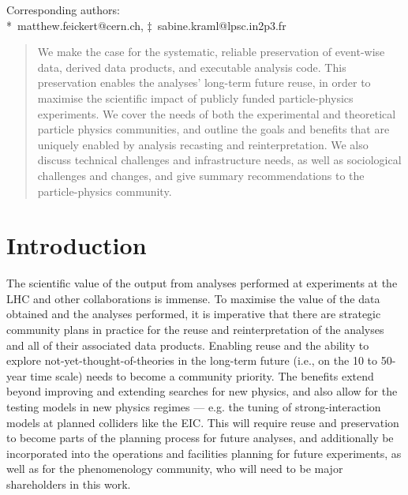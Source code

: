 \documentclass[11pt]{article}
\begin{document}
\begin{center}
Corresponding authors:\\
*~matthew.feickert@cern.ch, $\ddagger$~sabine.kraml@lpsc.in2p3.fr
\end{center}


\begin{abstract}
\noindent We make the case for the systematic, reliable preservation of event-wise data, derived data products, and executable analysis code. This preservation enables the analyses' long-term future reuse, in order to maximise the scientific impact of publicly funded particle-physics experiments.
We cover the needs of both the experimental and theoretical particle physics communities, and outline the goals and benefits that are uniquely enabled by analysis recasting and reinterpretation. 
We also discuss technical challenges and infrastructure needs, as well as sociological challenges and changes, and give summary recommendations to the particle-physics community.
\end{abstract}





\clearpage
%
\tableofcontents
\clearpage
\section{Introduction}

The scientific value of the output from analyses performed at experiments at the \gls{LHC} and other collaborations is immense.
To maximise the value of the data obtained and the analyses performed, it is imperative that there are strategic community plans in practice for the reuse and reinterpretation of the analyses and all of their associated data products.
Enabling reuse and the ability to explore not-yet-thought-of-theories in the long-term future (i.e., on the 10 to 50-year time scale) needs to become a community priority.
The benefits extend beyond improving and extending searches for new physics, and also allow for the testing models in new physics regimes --- e.g. the tuning of strong-interaction models at planned colliders like the \gls{EIC}.
This will require reuse and preservation to become parts of the planning process for future analyses, and additionally be incorporated into the operations and facilities planning for future experiments, as well as for the phenomenology community, who will need to be major shareholders in this work.
\end{document}
